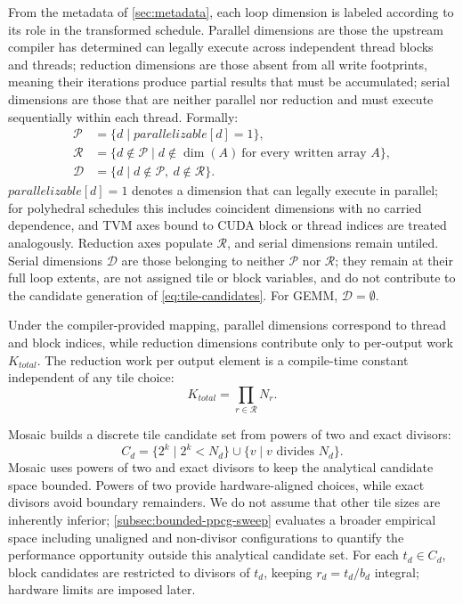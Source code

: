 \documentclass[acmsmall,review,anonymous,screen]{acmart}
\newcommand{\name}{{Mosaic}\xspace}
\newcommand{\tile}{t}
\newcommand{\rblk}{r}
\begin{document}
From the metadata of \autoref{sec:metadata}, each loop dimension is labeled according to its role in the transformed schedule. Parallel dimensions are those the upstream compiler has determined can legally execute across independent thread blocks and threads; reduction dimensions are those absent from all write footprints, meaning their iterations produce partial results that must be accumulated; serial dimensions are those that are neither parallel nor reduction and must execute sequentially within each thread. Formally:
\begin{equation}
\begin{aligned}
\mathcal{P}
&= \{d \mid \mathit{parallelizable}[d] = 1\},\\
\mathcal{R}
&= \{d \notin \mathcal{P}
    \mid d \notin \dim(A)\ \text{for every written array } A\},\\
\mathcal{D}
&= \{d \mid d\notin\mathcal{P},\ d\notin\mathcal{R}\}.
\end{aligned}
\label{eq:dimension-roles}
\end{equation}
\(\mathit{parallelizable}[d]=1\) denotes a dimension that can legally execute in parallel; for polyhedral schedules this includes coincident dimensions with no carried dependence, and TVM axes bound to CUDA block or thread indices are treated analogously. Reduction axes populate \(\mathcal{R}\), and serial dimensions remain untiled. Serial dimensions \(\mathcal{D}\) are those belonging to neither \(\mathcal{P}\) nor \(\mathcal{R}\); they remain at their full loop extents, are not assigned tile or block variables, and do not contribute to the candidate generation of \autoref{eq:tile-candidates}. For GEMM, \(\mathcal{D}=\emptyset\).

Under the compiler-provided mapping, parallel dimensions correspond to thread and block indices, while reduction dimensions contribute only to per-output work \(K_{\mathit{total}}\). The reduction work per output element is a compile-time constant independent of any tile choice:
\begin{equation}
K_{\mathit{total}} = \prod_{r \in \mathcal{R}} N_r.
\label{eq:reduction-work}
\end{equation}

\name builds a discrete tile candidate set from powers of two and exact divisors:
\begin{equation}
C_d
= \{2^k \mid 2^k < N_d\}
  \cup \{v \mid v \text{ divides } N_d\}.
\label{eq:tile-candidates}
\end{equation}
\name uses powers of two and exact divisors to keep the analytical candidate space bounded. Powers of two provide hardware-aligned choices, while exact divisors avoid boundary remainders. We do not assume that other tile sizes are inherently inferior; \autoref{subsec:bounded-ppcg-sweep} evaluates a broader empirical space including unaligned and non-divisor configurations to quantify the performance opportunity outside this analytical candidate set. For each \(\tile_d\in C_d\), block candidates are restricted to divisors of \(\tile_d\), keeping
\(\rblk_d=\tile_d/b_d\) integral; hardware limits are imposed later.
\end{document}
